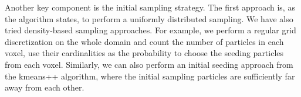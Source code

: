 Another key component is the initial sampling strategy. The first approach is, as the algorithm states, to perform a uniformly distributed sampling. We have also tried density-based sampling approaches. For example, we perform a regular grid discretization on the whole domain and count the number of particles in each voxel, use their cardinalities as the probability to choose the seeding particles from each voxel. Similarly, we can also perform an initial seeding approach from the kmeans++ algorithm, where the initial sampling particles are sufficiently far away from each other. 


